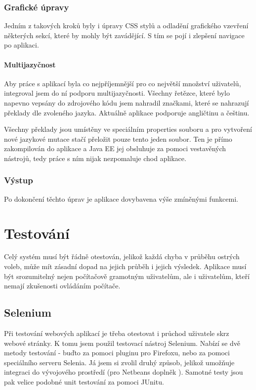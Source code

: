 \documentclass[11pt,twoside,a4paper]{book}
\begin{document}
\subsection{Grafické úpravy}

Jedním z takových kroků byly i úpravy CSS stylů a odladění grafického vzevření některých sekcí, které by mohly být zavádějící. S tím se pojí i zlepšení navigace po aplikaci.

\subsubsection{Multijazyčnost}

Aby práce s aplikací byla co nejpříjemnější pro co největší množství uživatelů, integroval jsem do ní podporu multijazyčnosti. Všechny řetězce, které bylo napevno vepsány do zdrojového kódu jsem nahradil značkami, které se nahrazují překlady dle zvoleného jazyka. Aktuálně aplikace podporuje angličtinu a češtinu. 

Všechny překlady jsou umístěny ve speciálním properties souboru a pro vytvoření nové jazykové mutace stačí přeložit pouze tento jeden soubor. Ten je přímo zakompilován do aplikace a Java EE jej obsluhuje za pomoci vestavěných nástrojů, tedy práce s ním nijak nezpomaluje chod aplikace.

\subsection{Výstup}

Po dokončení těchto úprav je aplikace dovybavena výše zmíněnými funkcemi.


\chapter{Testování}

Celý systém musí být řádně otestován, jelikož každá chyba v průběhu ostrých voleb, může mít zásadní dopad na jejich průběh i jejich výsledek. Aplikace musí být srozumitelný nejen počítačově gramotným uživatelům, ale i uživatelům, kteří nemají zkušenosti  ovládáním počítače. 


\section{Selenium}

Při testování webových aplikací je třeba otestovat i průchod uživatele skrz webové stránky. K tomu jsem použil testovací nástroj Selenium. Nabízí se dvě metody testování - buďto za pomoci pluginu pro Firefoxu, nebo za pomoci speciálního serveru Selenia. Já jsem si zvolil druhý způsob, jelikož umožňuje integraci do vývojového prostředí (pro Netbeans doplněk ). Samotné testy jsou pak velice podobné unit testování za pomoci JUnitu. 
\end{document}
